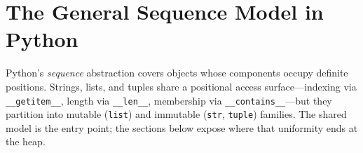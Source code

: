 \section{The General Sequence Model in Python}

Python's \emph{sequence} abstraction covers objects whose components occupy definite positions. Strings, lists, and tuples share a positional access surface---indexing via \texttt{\_\_getitem\_\_}, length via \texttt{\_\_len\_\_}, membership via \texttt{\_\_contains\_\_}---but they partition into mutable (\texttt{list}) and immutable (\texttt{str}, \texttt{tuple}) families. The shared model is the entry point; the sections below expose where that uniformity ends at the heap.
